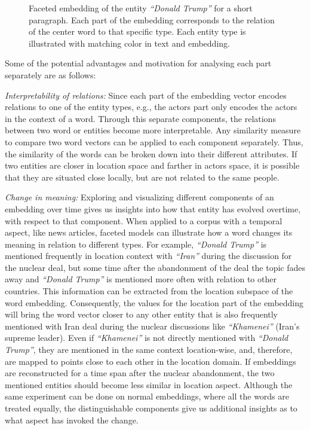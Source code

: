 \begin{figure}
\centering 
\resizebox{0.97\textwidth}{0.3\textwidth}{      

}
\caption{Faceted embedding of the entity \emph{``Donald Trump''} for a short paragraph. Each part of the embedding corresponds to the relation of the center word to that specific type. Each entity type is illustrated with matching color in text and embedding. }
\label{fig:faceted_emb}
\end{figure} 
\noindent
Some of the potential advantages and motivation for analysing each part separately are as follows: 
\begin{compactitem}
\item \emph{Interpretability of relations:} Since each part of the embedding vector encodes relations to one of the entity types, e.g., the actors part only encodes the actors in the context of a word. Through this separate components, the relations between two word or entities become more interpretable. Any similarity measure to compare two word vectors can be applied to each component separately. Thus, the similarity of the words can be broken down into their different attributes. If two entities are closer in location space and farther in actors space, it is possible that they are situated close locally, but are not related to the same people. \\

\item \emph{Change in meaning:} Exploring and visualizing different components of an embedding over time gives us insights into how that entity has evolved overtime, with respect to that component. When applied to a corpus with a temporal aspect, like news articles, faceted models can illustrate how a word changes its meaning in relation to different types. For example, \emph{``Donald Trump''} is mentioned frequently in location context with \emph{``Iran''} during the discussion for the nuclear deal, but some time after the abandonment of the deal the topic fades away and \emph{``Donald Trump''}  is mentioned more often with relation to other countries. This information can be extracted from the location subspace of the word embedding. Consequently, the values for the location part of the embedding will bring the word vector closer to any other entity that is also frequently mentioned with Iran deal during the nuclear discussions like \emph{``Khamenei''} (Iran's supreme leader). Even if \emph{``Khamenei''} is not directly mentioned with \emph{``Donald Trump''}, they are mentioned in the same context location-wise, and, therefore, are mapped to points close to each other in the location domain. If embeddings are reconstructed for a time span after the nuclear abandonment, the two mentioned entities should become less similar in location aspect. Although the same experiment can be done on normal embeddings, where all the words are treated equally, the distinguishable components give us additional insights as to what aspect has invoked the change.\\


\end{compactitem}
